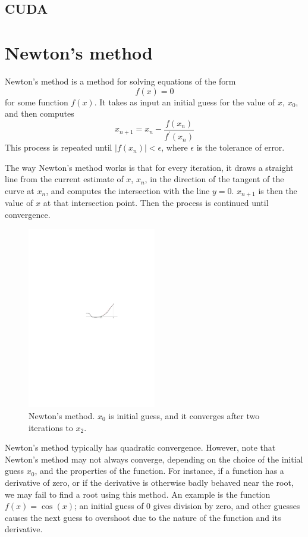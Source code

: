 \subsection{CUDA}

\section{Newton's method}
\label{sec:newtons_method}
Newton's method is a method for solving equations of the form
$$
f(x) = 0
$$
for some function $f(x)$. It takes as input an initial guess for the value of $x$, $x_0$, and then computes
\begin{equation}
x_{n+1} = x_{n} - \frac{f(x_n)}{f^\prime(x_n)}
\end{equation}
This process is repeated until $|f(x_n)| < \epsilon$, where $\epsilon$ is the tolerance of error. 

The way Newton's method works is that for every iteration, it draws a straight line from the current estimate of $x$, $x_n$, in the direction of the tangent of the curve at $x_n$, and computes the intersection with the line $y=0$. $x_{n+1}$ is then the value of $x$ at that intersection point. Then the process is continued until convergence. 

\begin{figure}[ht]
\centering
\includegraphics[width=0.5\textwidth]{figure/newtonsmethod}
\caption{Newton's method. $x_0$ is initial guess, and it converges after two iterations to $x_2$.}
\label{fig:newtons_method}
\end{figure}

Newton's method typically has quadratic convergence\cite{newton}. However, note that Newton's method may not always converge, depending on the choice of the initial guess $x_0$, and the properties of the function. For instance, if a function has a derivative of zero, or if the derivative is otherwise badly behaved near the root, we may fail to find a root using this method. An example is the function $f(x)=\cos(x)$; an initial guess of $0$ gives division by zero, and other guesses causes the next guess to overshoot due to the nature of the function and its derivative.

